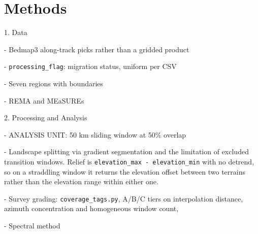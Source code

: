 \chapter{Methods}

 1. Data
  	
  	- Bedmap3 along-track picks rather than a gridded product~\cite{Pritchard_2025}
	
	- \texttt{processing\_flag}: migration status, uniform per CSV
  	
  	- Seven regions with boundaries~\cite{Ockenden_2025_data}

	- REMA and MEaSUREs

2. Processing and Analysis

	- ANALYSIS UNIT: 50 km sliding window at 50\% overlap

	- Landscape splitting via gradient segmentation and the limitation of excluded
    transition windows. Relief is \texttt{elevation\_max - elevation\_min} with no detrend, so
    on a straddling window it returns the elevation offset between two terrains
    rather than the elevation range within either one.

	- Survey grading: \texttt{coverage\_tags.py}, A/B/C tiers on interpolation distance,
   azimuth concentration and homogeneous window count,

   - Spectral method

